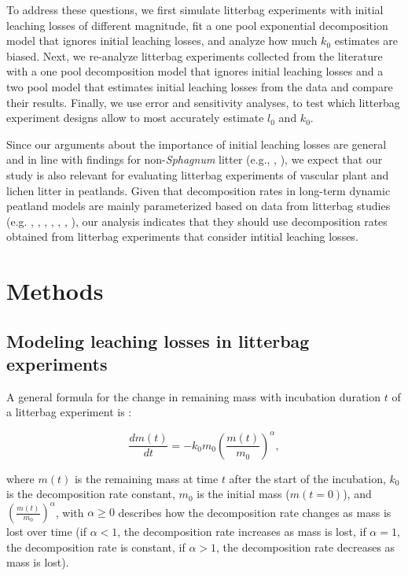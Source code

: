 \documentclass[bg, manuscript]{copernicus}
\begin{document}
To address these questions, we first simulate litterbag experiments with initial leaching losses of different magnitude, fit a one pool exponential decomposition model that ignores initial leaching losses, and analyze how much \(k_0\) estimates are biased. Next, we re-analyze litterbag experiments collected from the literature with a one pool decomposition model that ignores initial leaching losses and a two pool model that estimates initial leaching losses from the data and compare their results. Finally, we use error and sensitivity analyses, to test which litterbag experiment designs allow to most accurately estimate \(l_0\) and \(k_0\).

Since our arguments about the importance of initial leaching losses are general and in line with findings for non-\emph{Sphagnum} litter (e.g., \citet{Barlocher.1997}, \citet{Lind.2022}), we expect that our study is also relevant for evaluating litterbag experiments of vascular plant and lichen litter in peatlands. Given that decomposition rates in long-term dynamic peatland models are mainly parameterized based on data from litterbag studies (e.g. \citet{Frolking.2001}, \citet{Bauer.2004}, \citet{Heijmans.2008}, \citet{Heinemeyer.2010}, \citet{Morris.2012}, \citet{Chaudhary.2018}, \citet{Bona.2020}), our analysis indicates that they should use decomposition rates obtained from litterbag experiments that consider intitial leaching losses.

\section{Methods}

\hypertarget{out-methods-1}{%
\subsection{Modeling leaching losses in litterbag experiments}\label{out-methods-1}}

A general formula for the change in remaining mass with incubation duration \(t\) of a litterbag experiment is \citep{Frolking.2001}:

\begin{equation}
\frac{dm(t)}{dt} = -k_0 m_0 \left(\frac{m(t)}{m_0}\right)^\alpha,
\label{eq:decomposition-differential-1}
\end{equation}

where \(m(t)\) is the remaining mass at time \(t\) after the start of the incubation, \(k_0\) is the decomposition rate constant, \(m_0\) is the initial mass (\(m(t = 0)\)), and \(\left(\frac{m(t)}{m_0}\right)^\alpha\), with \(\alpha \ge 0\) describes how the decomposition rate changes as mass is lost over time (if \(\alpha<1\), the decomposition rate increases as mass is lost, if \(\alpha=1\), the decomposition rate is constant, if \(\alpha>1\), the decomposition rate decreases as mass is lost).
\end{document}
